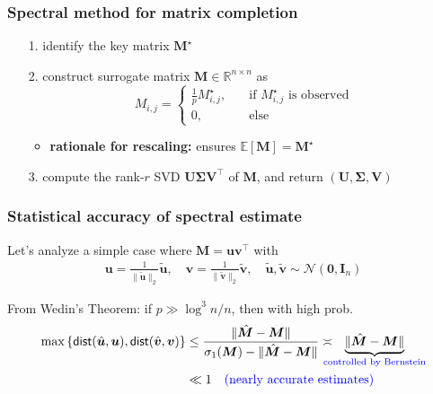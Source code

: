 \documentclass[compress,
mathserif,wide,%
]{beamer}
\begin{document}
\begin{frame}
\frametitle{Spectral method for matrix completion}

\begin{itemize}
	
	\item[{\color{black}1.}] identify the key matrix $\bm{M}^{\star}$
	\item[{\color{black}2.}] construct surrogate matrix ${\bm{M}}\in \mathbb{R}^{n\times n}$ as
	\[
		{M}_{i,j} = \begin{cases} \frac{1}{p} M_{i,j}^{\star}, \quad & \text{if }M_{i,j}^{\star}\text{ is observed} \\ 
					0,  & \text{else}	\end{cases} 
	\]
	\begin{itemize}
		\item {\bf rationale for rescaling:} ensures $\mathbb{E}[{\bm{M}}] = \bm{M}^{\star}$
	\end{itemize}

	\bigskip

\item[{\color{black}3.}] compute the rank-$r$ SVD ${\bm{U}}{\bm{\Sigma}}{\bm{V}}^{\top}$ of ${\bm{M}}$, and return $({\bm{U}}, {\bm{\Sigma}}, {\bm{V}})$

	
\end{itemize}


\end{frame}


\begin{frame}
\frametitle{Statistical accuracy of spectral estimate}

Let's analyze a simple case where $\bm{M}=\bm{u} \bm{v}^{\top}$ with
%
\begin{align*}
	\bm{u} = \frac{1}{\|\tilde{\bm{u}}\|_2} \tilde{\bm{u}}, \quad \bm{v} = \frac{1}{\|\tilde{\bm{v}}\|_2} \tilde{\bm{v}}, \quad \tilde{\bm{u}}, \tilde{\bm{v}} \sim \mathcal{N}(\bm{0},\bm{I}_n)
\end{align*}
%

\vfill

From Wedin's Theorem: if $p\gg\log^{3}n/n$, then with high prob.
%
\begin{align}
	\max\left\{ \mathsf{dist}(\hat{\bm{u}},\bm{u} ),\mathsf{dist}( \hat{\bm{v}},\bm{v} )\right\} 
	& \leq \frac{ \| \hat{\bm{M}} - \bm{M} \|  }{\sigma_1(\bm{M})-\| \hat{\bm{M}} - \bm{M} \| } \asymp \hspace{-1em}  \underset{\textcolor{blue}{ \text{controlled by Bernstein}}}{\underbrace{ \| \hat{\bm{M}} - \bm{M} \| }}  \nonumber\\
	& \ll 1 \quad \textcolor{blue}{ (\text{nearly accurate estimates})}  \label{eq:MC-perturbation}
\end{align}
%


\end{frame}
\end{document}
